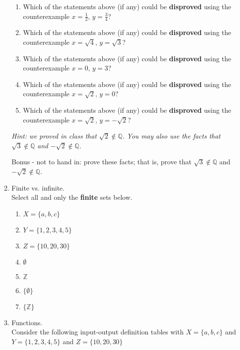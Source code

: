 \documentclass[12pt, oneside]{article}
\begin{document}
\begin{enumerate}
\begin{enumerate}
\item Which of the statements above (if any) could be {\bf disproved} using the counterexample 
$x = \frac{1}{2}$, $y= \frac{3}{4}$?
\item Which of the statements above (if any) could be {\bf disproved} using the counterexample 
$x = \sqrt{4}$, $y= \sqrt{3}$?
\item Which of the statements above (if any) could be {\bf disproved} using the counterexample 
$x = 0$, $y= 3$?
\item Which of the statements above (if any) could be {\bf disproved} using the counterexample 
$x = \sqrt{2}$, $y= 0$?
\item Which of the statements above (if any) could be {\bf disproved} using the counterexample 
$x = \sqrt{2}$, $y= -  \sqrt{2}$?
\end{enumerate}

{\it Hint: we proved in class that $\sqrt{2} \notin \mathbb{Q}$. You may also use the facts
that $\sqrt{3} \notin \mathbb{Q}$ and $-\sqrt{2} \notin \mathbb{Q}$.

Bonus - not to hand in: prove these facts; that is, prove that $\sqrt{3} \notin \mathbb{Q}$ and $-\sqrt{2} \notin \mathbb{Q}$. }
     \item Finite vs. infinite. \hspace{1in}\\ 

Select all and only the {\bf finite} sets below.

\begin{enumerate}
\item $X = \{ a,b,c\}$
\item $Y = \{ 1, 2, 3, 4, 5\}$
\item $Z = \{ 10, 20, 30 \}$
\item $\emptyset$
\item $\mathbb{Z}$
\item $\{ \emptyset \}$
\item $\{ \mathbb{Z} \}$
\end{enumerate}     \item Functions. \hspace{1in}\\ Consider the following input-output definition tables with $X = \{ a,b,c\}$ and 
$Y = \{ 1, 2, 3, 4, 5\}$ and $Z = \{ 10, 20, 30 \}$


\end{enumerate}
\end{document}

